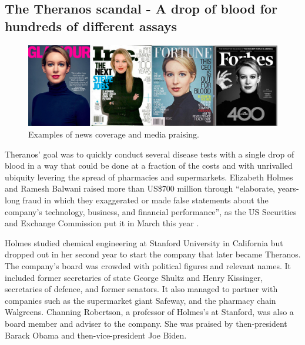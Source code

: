 \documentclass[
]{book}
\begin{document}
\hypertarget{the-theranos-scandal---a-drop-of-blood-for-hundreds-of-different-assays}{%
\subsection{The Theranos scandal - A drop of blood for hundreds of different assays}\label{the-theranos-scandal---a-drop-of-blood-for-hundreds-of-different-assays}}

\begin{figure}

{\centering \includegraphics[width=1\linewidth]{Figures/theranos} 

}

\caption{Examples of news coverage and media praising.}\label{fig:theranos}
\end{figure}

Theranos' goal was to quickly conduct several disease tests with a single drop of blood in a way that could be done at a fraction of the costs and with unrivalled ubiquity levering the spread of pharmacies and supermarkets.
Elizabeth Holmes and Ramesh Balwani raised more than US\$700 million through ``elaborate, years-long fraud in which they exaggerated or made false statements about the company's technology, business, and financial performance'', as the US Securities and Exchange Commission put it in March this year \citep{topol2018blood}.

Holmes studied chemical engineering at Stanford University in California but dropped out in her second year to start the company that later became Theranos.
The company's board was crowded with political figures and relevant names. It included former secretaries of state George Shultz and Henry Kissinger, secretaries of defence, and former senators. It also managed to partner with companies such as the supermarket giant Safeway, and the pharmacy chain Walgreens. Channing Robertson, a professor of Holmes's at Stanford, was also a board member and adviser to the company. She was praised by then-president Barack Obama and then-vice-president Joe Biden.
\end{document}
